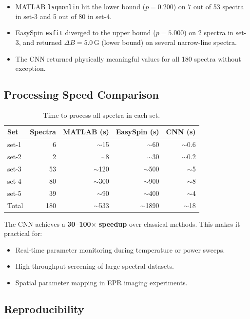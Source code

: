 \documentclass[a4paper,11pt]{article}
\begin{document}
\begin{itemize}
    \item MATLAB \texttt{lsqnonlin} hit the lower bound ($p = 0.200$) on
          7 out of 53 spectra in set-3 and 5 out of 80 in set-4.
    \item EasySpin \texttt{esfit} diverged to the upper bound ($p = 5.000$)
          on 2 spectra in set-3, and returned $\Delta B = 5.0$\,G (lower bound)
          on several narrow-line spectra.
    \item The CNN returned physically meaningful values for all 180 spectra
          without exception.
\end{itemize}

\subsection{Processing Speed Comparison}

\begin{table}[H]
\centering
\caption{Time to process all spectra in each set.}
\label{tab:speed}
\begin{tabular}{lrrrr}
\toprule
Set & Spectra & MATLAB (s) & EasySpin (s) & CNN (s) \\
\midrule
set-1 & 6   & $\sim$15   & $\sim$60    & $\sim$0.6 \\
set-2 & 2   & $\sim$8    & $\sim$30    & $\sim$0.2 \\
set-3 & 53  & $\sim$120  & $\sim$500   & $\sim$5   \\
set-4 & 80  & $\sim$300  & $\sim$900   & $\sim$8   \\
set-5 & 39  & $\sim$90   & $\sim$400   & $\sim$4   \\
\midrule
Total & 180 & $\sim$533  & $\sim$1890  & $\sim$18  \\
\bottomrule
\end{tabular}
\end{table}

The CNN achieves a \textbf{30--100$\times$ speedup} over classical methods.
This makes it practical for:
\begin{itemize}
    \item Real-time parameter monitoring during temperature or power sweeps.
    \item High-throughput screening of large spectral datasets.
    \item Spatial parameter mapping in EPR imaging experiments.
\end{itemize}

\subsection{Reproducibility}
\end{document}
